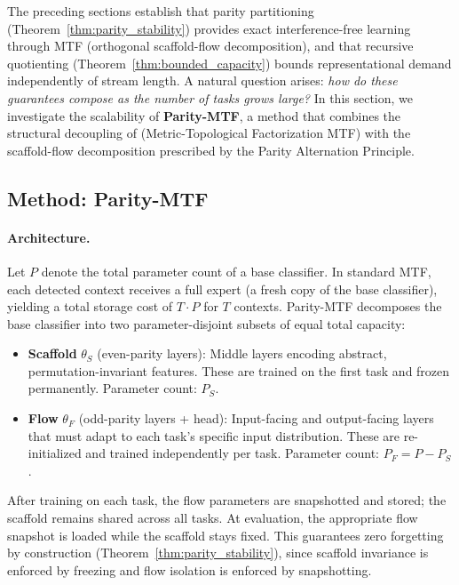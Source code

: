 \documentclass{article}
\begin{document}
The preceding sections establish that parity partitioning (Theorem~\ref{thm:parity_stability}) provides exact interference-free learning through MTF (orthogonal scaffold-flow decomposition), and that recursive quotienting (Theorem~\ref{thm:bounded_capacity}) bounds representational demand independently of stream length.
A natural question arises: \emph{how do these guarantees compose as the number of tasks grows large?}
In this section, we investigate the scalability of \textbf{Parity-MTF}, a method that combines the structural decoupling of (Metric-Topological Factorization MTF) with the scaffold-flow decomposition prescribed by the Parity Alternation Principle.

\subsection{Method: Parity-MTF}

\paragraph{Architecture.}
Let $P$ denote the total parameter count of a base classifier.
In standard MTF, each detected context receives a full expert (a fresh copy of the base classifier), yielding a total storage cost of $T \cdot P$ for $T$ contexts.
Parity-MTF decomposes the base classifier into two parameter-disjoint subsets of equal total capacity:
\begin{itemize}
    \item \textbf{Scaffold} $\theta_S$ (even-parity layers): Middle layers encoding abstract, permutation-invariant features.
    These are trained on the first task and frozen permanently. Parameter count: $P_S$.
    \item \textbf{Flow} $\theta_F$ (odd-parity layers + head): Input-facing and output-facing layers that must adapt to each task's specific input distribution.
    These are re-initialized and trained independently per task. Parameter count: $P_F = P - P_S$.
\end{itemize}

After training on each task, the flow parameters are snapshotted and stored; the scaffold remains shared across all tasks.
At evaluation, the appropriate flow snapshot is loaded while the scaffold stays fixed.
This guarantees zero forgetting by construction (Theorem~\ref{thm:parity_stability}), since scaffold invariance is enforced by freezing and flow isolation is enforced by snapshotting.
\end{document}
